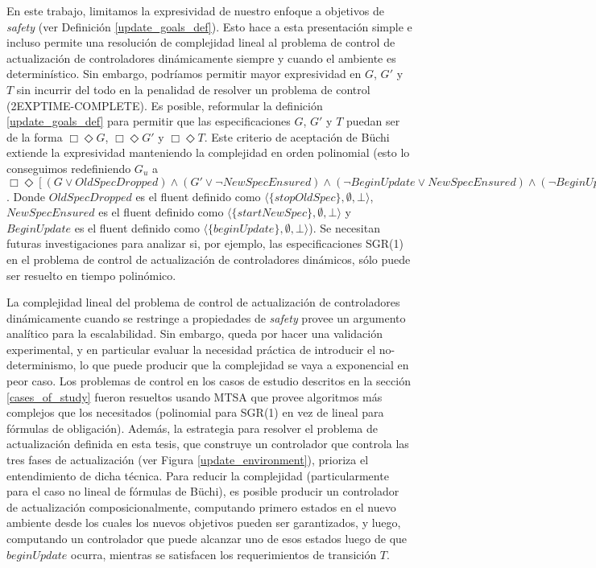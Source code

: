 En este trabajo, limitamos la expresividad de nuestro enfoque a objetivos de \emph{safety} (ver Definición
\ref{update_goals_def}). Esto hace a esta presentación simple e incluso permite una resolución de complejidad lineal al
problema de control de actualización de controladores dinámicamente siempre y cuando el ambiente es determinístico. Sin
embargo, podríamos permitir mayor expresividad en $G$, $G'$ y $T$ sin incurrir del todo en la penalidad de resolver un
problema de control (2EXPTIME-COMPLETE). Es posible, reformular la definición \ref{update_goals_def} para permitir que
las especificaciones $G$, $G'$ y $T$ puedan ser de la forma $\Box \Diamond G$, $\Box \Diamond G'$ y $\Box \Diamond T$.
Este criterio de aceptación de Büchi extiende la expresividad manteniendo la complejidad en orden polinomial (esto lo
conseguimos redefiniendo $G_u$ a $\Box \Diamond [(G \lor OldSpecDropped) \wedge (G' \lor \neg NewSpecEnsured) \wedge
(\neg BeginUpdate \lor NewSpecEnsured) \wedge (\neg BeginUpdate \lor  OldSpecDropped) \wedge  T]$. Donde
$OldSpecDropped$ es el fluent definido como $\langle \{stopOldSpec\},\emptyset,\bot\rangle$, $NewSpecEnsured$ es el fluent
definido como $\langle \{startNewSpec\},\emptyset,\bot\rangle$ y $BeginUpdate$ es el fluent definido como $\langle
\{beginUpdate\},\emptyset,\bot\rangle$). Se necesitan futuras investigaciones para analizar si, por ejemplo, las
especificaciones SGR(1) \cite{D'ippolito:2013:SNE:2430536.2430543} en el problema de control de actualización de
controladores dinámicos, sólo puede ser resuelto en tiempo polinómico.

La complejidad lineal del problema de control de actualización de controladores dinámicamente cuando se restringe a
propiedades de \emph{safety} provee un argumento analítico para la escalabilidad. Sin embargo, queda por hacer una
validación experimental, y en particular evaluar la necesidad práctica de introducir el no-determinismo, lo que puede
producir que la complejidad se vaya a exponencial en peor caso. Los problemas de control en los casos de estudio
descritos en la sección \ref{cases_of_study} fueron resueltos usando MTSA que provee algoritmos más complejos que los
necesitados (polinomial para SGR(1) en vez de lineal para fórmulas de obligación). Además, la estrategia para resolver
el problema de actualización definida en esta tesis, que construye un controlador que controla las tres fases de
actualización (ver Figura \ref{update_environment}), prioriza el entendimiento de dicha técnica. Para reducir la
complejidad (particularmente para el caso no lineal de fórmulas de Büchi), es posible producir un controlador de
actualización composicionalmente, computando primero estados en el nuevo ambiente desde los cuales los nuevos objetivos
pueden ser garantizados, y luego, computando un controlador que puede alcanzar uno de esos estados luego de
que $beginUpdate$ ocurra, mientras se satisfacen los requerimientos de transición $T$.

